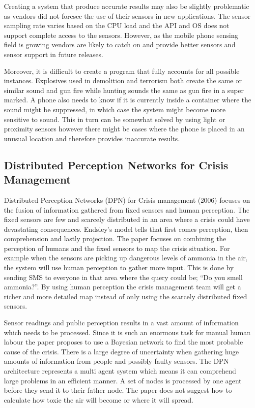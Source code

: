 Creating a system that produce accurate results may also be slightly problematic as vendors did not foresee the use of their sensors in new applications. The sensor sampling rate varies based on the CPU load and the API and OS does not support complete access to the sensors. However, as the mobile phone sensing field is growing vendors are likely to catch on and provide better sensors and sensor support in future releases.

Moreover, it is difficult to create a program that fully accounts for all possible instances. Explosives used in demolition and terrorism both create the same or similar sound and gun fire while hunting sounds the same as gun fire in a super marked. A phone also needs to know if it is currently inside a container where the sound might be suppressed, in which case the system might become more sensitive to sound. This in turn can be somewhat solved by using light or proximity sensors however there might be cases where the phone is placed in an unusual location and therefore provides inaccurate results.

\subsection{Distributed Perception Networks for Crisis Management}

Distributed Perception Networks (DPN) for Crisis management (2006)\cite{dpn} focuses on the fusion of information gathered from fixed sensors and human perception. The fixed sensors are few and scarcely distributed in an area where a crisis could have devastating consequences. Endsley’s model tells that first comes perception, then comprehension and lastly projection. The paper focuses on combining the perception of humans and the fixed sensors to map the crisis situation. For example when the sensors are picking up dangerous levels of ammonia in the air, the system will use human perception to gather more input. This is done by sending SMS to everyone in that area where the query could be; “Do you smell ammonia?”. By using human perception the crisis management team will get a richer and more detailed map instead of only using the scarcely distributed fixed sensors.

Sensor readings and public perception results in a vast amount of information which needs to be processed. Since it is such an enormous task for manual human labour the paper proposes to use a Bayesian network to find the most probable cause of the crisis. There is a large degree of uncertainty when gathering huge amounts of information from people and possibly faulty sensors. The DPN architecture represents a multi agent system which means it can comprehend large problems in an efficient manner. A set of nodes is processed by one agent before they send it to their father node. The paper does not suggest how to calculate how toxic the air will become or where it will spread.  

